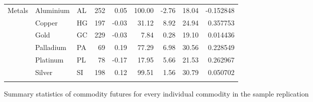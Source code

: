 \documentclass{article}
\begin{document}
\begin{adjustbox}{width=\textwidth}
\begin{tabular}{lllrrrrrr}
\multirow[c]{6}{*}{Metals} & Aluminium & AL & 252 & 0.05 & 100.00 & -2.76 & 18.04 & -0.152848 \\
 & Copper & HG & 197 & -0.03 & 31.12 & 8.92 & 24.94 & 0.357753 \\
 & Gold & GC & 229 & -0.03 & 7.84 & 0.28 & 19.10 & 0.014436 \\
 & Palladium & PA & 69 & 0.19 & 77.29 & 6.98 & 30.56 & 0.228549 \\
 & Platinum & PL & 78 & -0.17 & 17.95 & 5.66 & 21.53 & 0.262967 \\
 & Silver & SI & 198 & 0.12 & 99.51 & 1.56 & 30.79 & 0.050702 \\
 \bottomrule
\caption{Summary statistics of commodity futures for every individual commodity in the sample replication}
\end{tabular}
\end{adjustbox}
\caption{Summary statistics of commodity futures for every individual commodity in the sample replication}
\label{table:commodity_Original}
\end{document}
